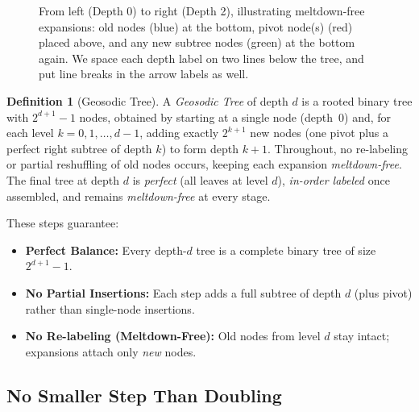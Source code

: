 \documentclass[acmsmall]{acmart}
\theoremstyle{definition}
\newtheorem{definition}[theorem]{Definition}
\theoremstyle{remark}
\begin{document}
\begin{figure}[ht]
  
  \caption{From left (Depth 0) to right (Depth 2), illustrating meltdown-free expansions:
  old nodes (blue) at the bottom, pivot node(s) (red) placed above,
  and any new subtree nodes (green) at the bottom again. 
  We space each depth label on two lines below the tree, 
  and put line breaks in the arrow labels as well.}
  \label{fig:geosodic-expansion}
  \end{figure}
   
\begin{definition}[Geosodic Tree]
\label{def:geosodic-tree}
A \emph{Geosodic Tree} of depth $d$ is a rooted binary tree with $2^{d+1}-1$ nodes,
obtained by starting at a single node (depth~0) and, for each level $k=0,1,\dots,d-1$, 
adding exactly $2^{k+1}$ new nodes (one pivot plus a perfect right subtree of depth $k$) 
to form depth $k+1$. Throughout, no re-labeling or partial reshuffling of old nodes occurs,
keeping each expansion \emph{meltdown-free}. The final tree at depth $d$ is \emph{perfect} 
(all leaves at level $d$), \emph{in-order labeled} once assembled, and remains 
\emph{meltdown-free} at every stage.
\end{definition}

These steps guarantee:
\begin{itemize}
  \item \textbf{Perfect Balance:} Every depth-$d$ tree is a complete binary tree of size $2^{d+1}-1$.
  \item \textbf{No Partial Insertions:} Each step adds a full subtree of depth $d$ (plus pivot) 
        rather than single-node insertions.
  \item \textbf{No Re-labeling (Meltdown-Free):} Old nodes from level $d$ stay intact; 
        expansions attach only \emph{new} nodes.
\end{itemize}

\subsection{No Smaller Step Than Doubling}
\label{subsec:no-smaller}
\end{document}
